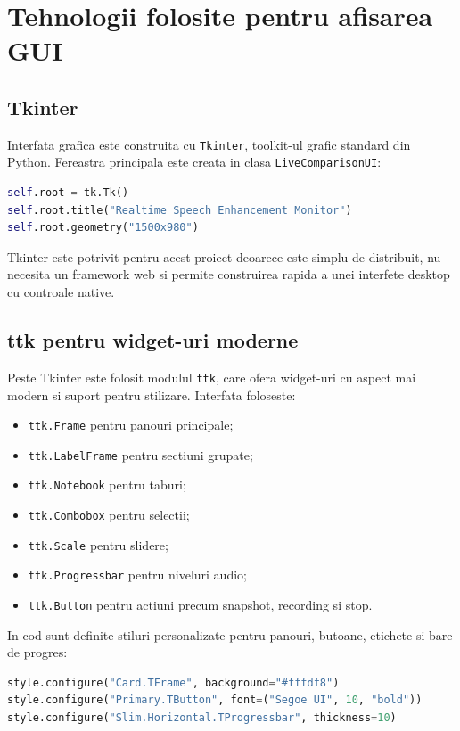 \documentclass[12pt,a4paper]{article}
\begin{document}
\section{Tehnologii folosite pentru afisarea GUI}

\subsection{Tkinter}

Interfata grafica este construita cu \texttt{Tkinter}, toolkit-ul grafic standard
din Python. Fereastra principala este creata in clasa \texttt{LiveComparisonUI}:

\begin{lstlisting}[language=Python]
self.root = tk.Tk()
self.root.title("Realtime Speech Enhancement Monitor")
self.root.geometry("1500x980")
\end{lstlisting}

Tkinter este potrivit pentru acest proiect deoarece este simplu de distribuit,
nu necesita un framework web si permite construirea rapida a unei interfete
desktop cu controale native.

\subsection{ttk pentru widget-uri moderne}

Peste Tkinter este folosit modulul \texttt{ttk}, care ofera widget-uri cu aspect
mai modern si suport pentru stilizare. Interfata foloseste:

\begin{itemize}
    \item \texttt{ttk.Frame} pentru panouri principale;
    \item \texttt{ttk.LabelFrame} pentru sectiuni grupate;
    \item \texttt{ttk.Notebook} pentru taburi;
    \item \texttt{ttk.Combobox} pentru selectii;
    \item \texttt{ttk.Scale} pentru slidere;
    \item \texttt{ttk.Progressbar} pentru niveluri audio;
    \item \texttt{ttk.Button} pentru actiuni precum snapshot, recording si stop.
\end{itemize}

In cod sunt definite stiluri personalizate pentru panouri, butoane, etichete si
bare de progres:

\begin{lstlisting}[language=Python]
style.configure("Card.TFrame", background="#fffdf8")
style.configure("Primary.TButton", font=("Segoe UI", 10, "bold"))
style.configure("Slim.Horizontal.TProgressbar", thickness=10)
\end{lstlisting}
\end{document}
